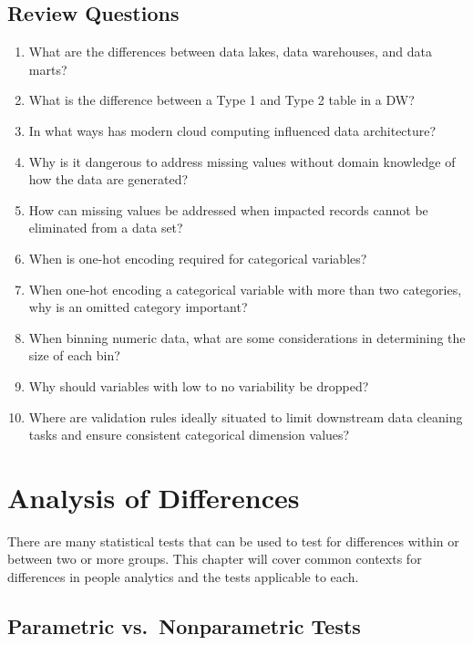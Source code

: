 \documentclass[
]{book}
\begin{document}
\hypertarget{review-questions-6}{%
\section{Review Questions}\label{review-questions-6}}

\begin{enumerate}
\def\labelenumi{\arabic{enumi}.}
\item
  What are the differences between data lakes, data warehouses, and data marts?
\item
  What is the difference between a Type 1 and Type 2 table in a DW?
\item
  In what ways has modern cloud computing influenced data architecture?
\item
  Why is it dangerous to address missing values without domain knowledge of how the data are generated?
\item
  How can missing values be addressed when impacted records cannot be eliminated from a data set?
\item
  When is one-hot encoding required for categorical variables?
\item
  When one-hot encoding a categorical variable with more than two categories, why is an omitted category important?
\item
  When binning numeric data, what are some considerations in determining the size of each bin?
\item
  Why should variables with low to no variability be dropped?
\item
  Where are validation rules ideally situated to limit downstream data cleaning tasks and ensure consistent categorical dimension values?
\end{enumerate}

\hypertarget{aod}{%
\chapter{Analysis of Differences}\label{aod}}

There are many statistical tests that can be used to test for differences within or between two or more groups. This chapter will cover common contexts for differences in people analytics and the tests applicable to each.

\hypertarget{parametric-vs.-nonparametric-tests}{%
\section{Parametric vs.~Nonparametric Tests}\label{parametric-vs.-nonparametric-tests}}
\end{document}
